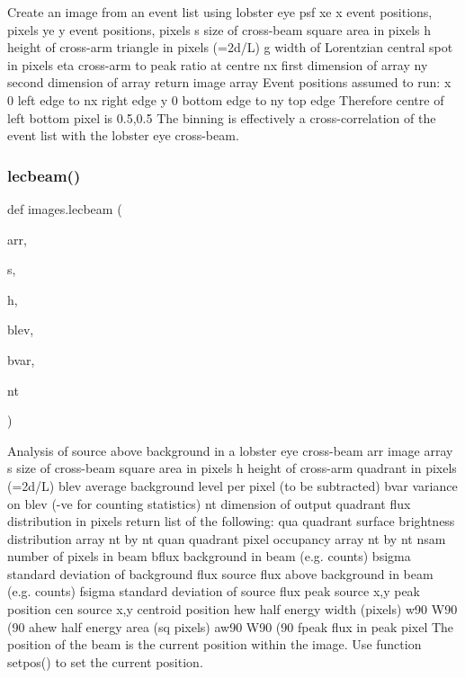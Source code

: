 \begin{DoxyVerb}Create an image from an event list using lobster eye psf
    xe       x event positions, pixels
    ye       y event positions, pixels
    s       size of cross-beam square area in pixels
    h       height of cross-arm triangle in pixels (=2d/L)
    g       width of Lorentzian central spot in pixels
    eta     cross-arm to peak ratio at centre
    nx      first dimension of array
    ny      second dimension of array
return  image array
    Event positions assumed to run:
        x 0 left edge to nx right edge
        y 0 bottom edge to ny top edge
    Therefore centre of left bottom pixel is 0.5,0.5
    The binning is effectively a cross-correlation of the event list with the lobster eye cross-beam.
\end{DoxyVerb}
 \mbox{\label{namespaceimages_af968ed455d536c5be4a28b5984765f3d}} 
\subsubsection{\texorpdfstring{lecbeam()}{lecbeam()}}
{\footnotesize\ttfamily def images.\+lecbeam (\begin{DoxyParamCaption}\item[{}]{arr,  }\item[{}]{s,  }\item[{}]{h,  }\item[{}]{blev,  }\item[{}]{bvar,  }\item[{}]{nt }\end{DoxyParamCaption})}

\begin{DoxyVerb}Analysis of source above background in a lobster eye cross-beam
    arr      image array
    s        size of cross-beam square area in pixels
    h        height of cross-arm quadrant in pixels (=2d/L)
    blev     average background level per pixel (to be subtracted)
    bvar     variance on blev (-ve for counting statistics)
    nt       dimension of output quadrant flux distribution in pixels
return   list of the following:
    qua      quadrant surface brightness distribution array nt by nt
    quan     quadrant  pixel occupancy array nt by nt
    nsam     number of pixels in beam
    bflux    background in beam (e.g. counts)
    bsigma   standard deviation of background
    flux     source flux above background in beam (e.g. counts)
    fsigma   standard deviation of source flux
    peak     source x,y peak position
    cen      source x,y centroid position
    hew      half energy width (pixels)
    w90      W90 (90%
    ahew     half energy area (sq pixels)
    aw90     W90 (90%
    fpeak    flux in peak pixel
The position of the beam is the current position within the image. Use function setpos() to set the current position.
\end{DoxyVerb}
 \mbox{\label{namespaceimages_a09118bff749ce221bcab7cbc813f3e5e}} 
